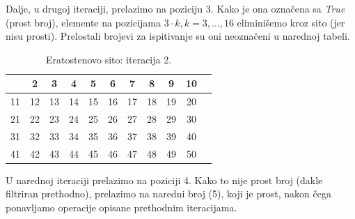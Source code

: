 Dalje, u drugoj iteraciji, prelazimo na poziciju 3. Kako je ona označena sa \emph{True} (prost broj), elemente na pozicijama $3\cdot k, k=3, \ldots, 16$ eliminišemo kroz sito (jer nisu prosti). Prelostali brojevi za ispitivanje su oni neoznačeni u narednoj tabeli. 


\begin{table}[H]
	\centering
	\begin{tabular}{|c|c|c|c|c|c|c|c|c|c|c} \hline
	& 2 & 3 & \cellcolor{red!30}  4 & 5 & \cellcolor{red!30} 6 & 7 & \cellcolor{red!30} 8 & \cellcolor{red!70} 9 & \cellcolor{red!30} 10 \\ \hline
	11 &\cellcolor{red!30}  12 & 13 & \cellcolor{red!30} 14 & \cellcolor{red!70} 15 & \cellcolor{red!30} 16 & 17 & \cellcolor{red!30} \cellcolor{red!30} 18 & 19 & \cellcolor{red!30} \cellcolor{red!30} 20 \\ \hline
	\cellcolor{red!70} 21 & \cellcolor{red!30} 22 & 23 & \cellcolor{red!30} 24 & 25 & \cellcolor{red!30} 26 & \cellcolor{red!70}  27 &\cellcolor{red!30}  28 & 29 & \cellcolor{red!30} \cellcolor{red!30} 30 \\ \hline
	31 & \cellcolor{red!30} 32 & \cellcolor{red!70} 33 & \cellcolor{red!30} 34 & 35 & \cellcolor{red!30} 36 & 37 & \cellcolor{red!30} 38 &  \cellcolor{red!70}   39 & \cellcolor{red!30} 40 \\ \hline
	41 & \cellcolor{red!30} 42 & 43 & \cellcolor{red!30} 44 & \cellcolor{red!70} 45 & \cellcolor{red!30} 46 & 47 &\cellcolor{red!30}  48 & 49 &\cellcolor{red!30}  50 \\ \hline     
\end{tabular}
        \caption{Eratostenovo sito: iteracija 2.} \label{eratosten-sieve-it-2}
\end{table}

U narednoj iteraciji prelazimo na poziciji 4. Kako to nije prost broj (dakle filtriran prethodno), prelazimo na naredni broj (5), koji je prost, nakon čega ponavljamo operacije opisane prethodnim iteracijama. 


